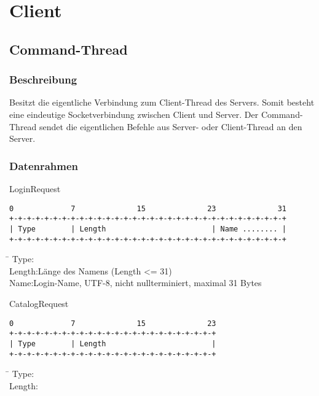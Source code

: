 \documentclass[a4paper,10pt]{article}
\begin{document}
\section{Client}

\subsection{Command-Thread}

\subsubsection{Beschreibung}

Besitzt die eigentliche Verbindung zum Client-Thread des Servers. Somit besteht eine eindeutige Socketverbindung zwischen Client und Server. 
Der Command-Thread sendet die eigentlichen Befehle aus Server- oder Client-Thread an den Server. 

\subsubsection{Datenrahmen}

LoginRequest

\begin{Verbatim}[fontfamily=courier]
 0             7              15              23              31
+-+-+-+-+-+-+-+-+-+-+-+-+-+-+-+-+-+-+-+-+-+-+-+-+-+-+-+-+-+-+-+
| Type        | Length                        | Name ........ |
+-+-+-+-+-+-+-+-+-+-+-+-+-+-+-+-+-+-+-+-+-+-+-+-+-+-+-+-+-+-+-+
\end{Verbatim}

\begin{tabbing}
\hspace{2 cm}\=\kill
Type:\\
Length:\>Länge des Namens (Length <= 31)\\
Name:\>Login-Name, UTF-8, nicht nullterminiert, maximal 31 Bytes\\
\end{tabbing}

$~~$\\CatalogRequest

\begin{Verbatim}[fontfamily=courier]
0             7              15              23
+-+-+-+-+-+-+-+-+-+-+-+-+-+-+-+-+-+-+-+-+-+-+-+
| Type        | Length                        |
+-+-+-+-+-+-+-+-+-+-+-+-+-+-+-+-+-+-+-+-+-+-+-+
\end{Verbatim}

\begin{tabbing}
\hspace{2 cm}\=\kill
Type:\\
Length:\\
\end{tabbing}
\end{document}
